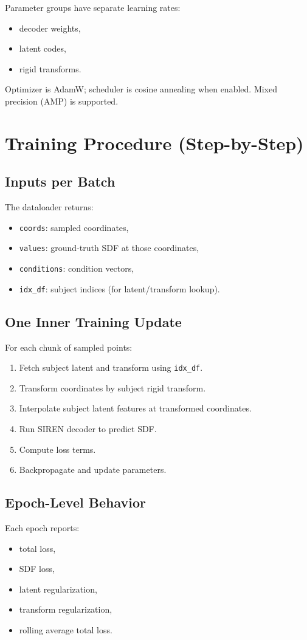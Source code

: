 ﻿\documentclass[11pt]{article}
\begin{document}
Parameter groups have separate learning rates:
\begin{itemize}[leftmargin=*]
    \item decoder weights,
    \item latent codes,
    \item rigid transforms.
\end{itemize}

Optimizer is AdamW; scheduler is cosine annealing when enabled. Mixed precision (AMP) is supported.

\section{Training Procedure (Step-by-Step)}
\subsection{Inputs per Batch}
The dataloader returns:
\begin{itemize}[leftmargin=*]
    \item \texttt{coords}: sampled coordinates,
    \item \texttt{values}: ground-truth SDF at those coordinates,
    \item \texttt{conditions}: condition vectors,
    \item \texttt{idx\_df}: subject indices (for latent/transform lookup).
\end{itemize}

\subsection{One Inner Training Update}
For each chunk of sampled points:
\begin{enumerate}[leftmargin=*]
    \item Fetch subject latent and transform using \texttt{idx\_df}.
    \item Transform coordinates by subject rigid transform.
    \item Interpolate subject latent features at transformed coordinates.
    \item Run SIREN decoder to predict SDF.
    \item Compute loss terms.
    \item Backpropagate and update parameters.
\end{enumerate}

\subsection{Epoch-Level Behavior}
Each epoch reports:
\begin{itemize}[leftmargin=*]
    \item total loss,
    \item SDF loss,
    \item latent regularization,
    \item transform regularization,
    \item rolling average total loss.
\end{itemize}
\end{document}
